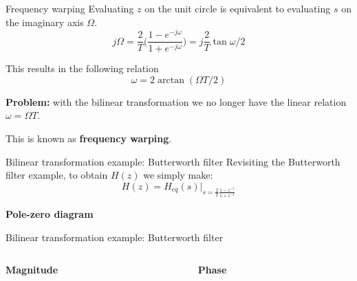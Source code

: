 \documentclass[10pt, handout]{beamer}
\begin{document}
\begin{frame}{Frequency warping}
	Evaluating $z$ on the unit circle is equivalent to evaluating $s$ on the imaginary axis $\Omega$.
	\begin{equation*}
j\Omega = \frac{2}{T}\bigg(\frac{1 - e^{-j\omega}}{1 + e^{-j\omega}}\bigg) = j\frac{2}{T}\tan\omega/2
\end{equation*}

This results in the following relation
\begin{equation*}
	\omega =2\arctan(\Omega T/2) \tag{frequency warping}
\end{equation*}

\textbf{Problem:} with the bilinear transformation we no longer have the linear relation $\omega = \Omega T$.

This is known as \textbf{frequency warping}.

\begin{center}
	\resizebox{0.4\linewidth}{!}{}
\end{center}
\end{frame}

%
\begin{frame}{Bilinear transformation example: Butterworth filter}
Revisiting the Butterworth filter example, to obtain $H(z)$ we simply make:
\begin{equation*}
	H(z) = H_{eq}(s)|_{s = \frac{2}{T}\frac{1 - z^{-1}}{1 + z^{-1}}}
\end{equation*}

\textbf{Pole-zero diagram}
\begin{center}
	\resizebox{0.7\linewidth}{!}{}
\end{center}

\end{frame}


%
\begin{frame}{Bilinear transformation example: Butterworth filter}

\vspace{4mm}
\begin{columns}
	\begin{column}{0.5\textwidth}
		\textbf{Magnitude}
		\begin{center}
			\resizebox{\linewidth}{!}{}
		\end{center}
	\end{column}
	\begin{column}{0.5\textwidth}
		\textbf{Phase}
		\begin{center}
			\resizebox{\linewidth}{!}{}
		\end{center}
	\end{column}
\end{columns}

\end{frame}
\end{document}
